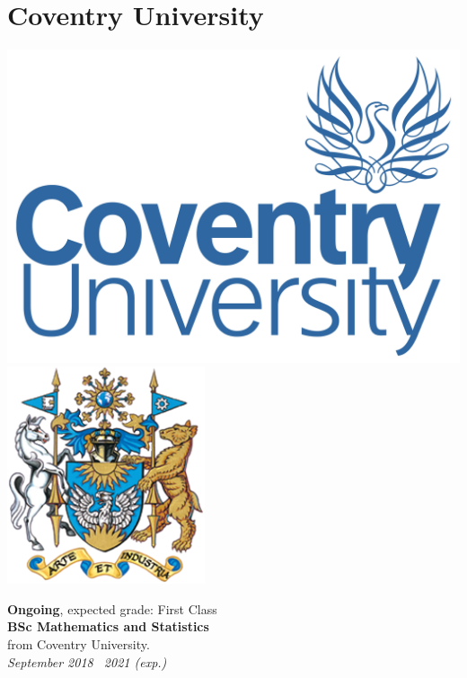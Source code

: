 \documentclass[9pt,a4paper]{article}
\begin{document}
\maketitle
\tableofcontents\pagebreak
\section{Coventry University}
\begin{center}
	\includegraphics[height=0.15\textheight]{covuni.jpg}
	\includegraphics[height=0.15\textheight]{covuni_coa.png}
\end{center}
\begin{center}
\noindent\textbf{Ongoing}, expected grade: First Class\\
\noindent\textbf{BSc Mathematics and Statistics}\\
\noindent from Coventry University.\\
\noindent\emph{September 2018 \textemdash\ 2021 (exp.)}
\end{center}
\end{document}
